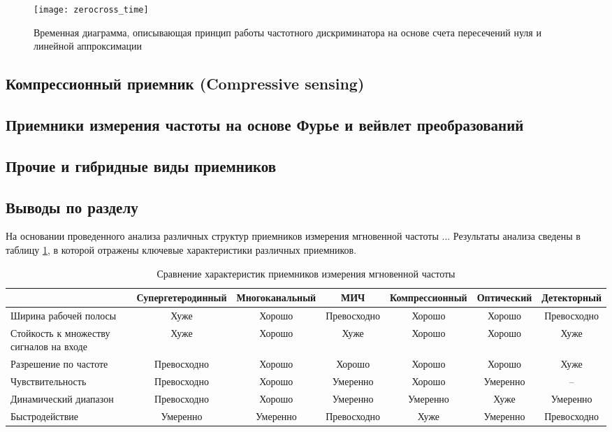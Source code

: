 \begin{figure}[ht]
	\centering
	\texttt{[image: zerocross\_time]}
	
	\caption{Временная диаграмма, описывающая принцип работы частотного дискриминатора на основе счета пересечений нуля и линейной аппроксимации}
	\label{ct:zerocross_time}
\end{figure}

\subsection{Компрессионный приемник (Compressive sensing)}

\subsection{Приемники измерения частоты на основе Фурье и вейвлет преобразований}

\subsection{Прочие и гибридные виды приемников}

\subsection{Выводы по разделу}

На основании проведенного анализа различных структур приемников измерения мгновенной частоты ...
Результаты анализа сведены в таблицу \ref{t:survey}, в которой отражены ключевые характеристики различных приемников.

\begin{table}
\caption{Сравнение характеристик приемников измерения мгновенной частоты\label{t:survey}}
	\begin{adjustbox}{width=\columnwidth,center}
		
		\begin{tabular}{@{}m{8em}cccccc@{}}
			\toprule
													&	Супергетеродинный	& Многоканальный & МИЧ & Компрессионный & Оптический & Детекторный\\
			\midrule
			Ширина рабочей полосы					&	Хуже 				& Хорошо	& Превосходно	& Хорошо & Хорошо & Превосходно\\
			Стойкость к множеству сигналов на входе &	Хуже 				& Хорошо	& Хуже	& Хорошо & Хорошо & Хуже\\
			Разрешение по частоте 					& 	Превосходно 		& Хорошо	& Хорошо	& Хорошо & Хорошо & Хуже\\
			Чувствительность 						& 	Превосходно 		& Хорошо	& Умеренно	& Хорошо & Умеренно & --\\
			Динамический диапазон 					& 	Превосходно 		& Хорошо	& Умеренно	& Умеренно & Хуже & Умеренно\\
			Быстродействие							&	Умеренно			& Умеренно	& Превосходно & Хуже	& Умеренно & Превосходно \\
			\bottomrule
		\end{tabular}
	\end{adjustbox}
\end{table}

